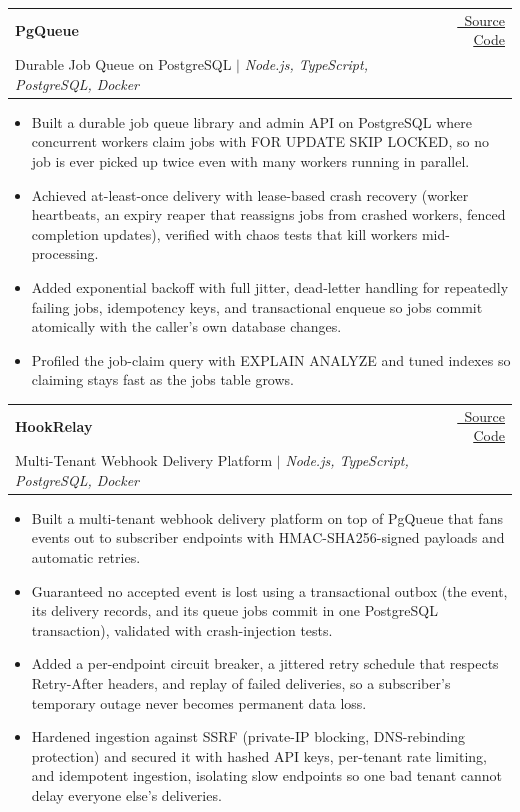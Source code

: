 \documentclass[a4paper,10pt]{article}
\makeatletter
\newcommand{\link}[2]{\href{#1}{\textcolor{NavyBlue}{\underline{#2}}}}
\newcommand{\resumeItem}[1]{
  \item\small{
    {#1 \vspace{-2pt}}
  }
}
\newcommand{\resumeProjectHeading}[3]{
    \item
    \begin{tabular*}{0.97\textwidth}{l@{\extracolsep{\fill}}r}
      \small\textbf{#1} & \small#3 \\[2pt]
      \small#2 & \\
    \end{tabular*}\vspace{-7pt}
}
\newcommand{\resumeItemListStart}{\begin{itemize}[leftmargin=0.2in]}
\newcommand{\resumeItemListEnd}{\end{itemize}\vspace{-5pt}}
\makeatother
\begin{document}
    \resumeProjectHeading
      {PgQueue}
      {Durable Job Queue on PostgreSQL \hspace{0.5em}$|$\hspace{0.5em} \emph{Node.js, TypeScript, PostgreSQL, Docker}}
      {\link{https://github.com/nitish9302/pgqueue}{\faCode\ Source Code}}
      \resumeItemListStart
        \resumeItem{Built a durable job queue library and admin API on PostgreSQL where concurrent workers claim jobs with FOR UPDATE SKIP LOCKED, so no job is ever picked up twice even with many workers running in parallel.}
        \resumeItem{Achieved at-least-once delivery with lease-based crash recovery (worker heartbeats, an expiry reaper that reassigns jobs from crashed workers, fenced completion updates), verified with chaos tests that kill workers mid-processing.}
        \resumeItem{Added exponential backoff with full jitter, dead-letter handling for repeatedly failing jobs, idempotency keys, and transactional enqueue so jobs commit atomically with the caller's own database changes.}
        \resumeItem{Profiled the job-claim query with EXPLAIN ANALYZE and tuned indexes so claiming stays fast as the jobs table grows.}
      \resumeItemListEnd

    \resumeProjectHeading
      {HookRelay}
      {Multi-Tenant Webhook Delivery Platform \hspace{0.5em}$|$\hspace{0.5em} \emph{Node.js, TypeScript, PostgreSQL, Docker}}
      {\link{https://github.com/nitish9302/hookrelay}{\faCode\ Source Code}}
      \resumeItemListStart
        \resumeItem{Built a multi-tenant webhook delivery platform on top of PgQueue that fans events out to subscriber endpoints with HMAC-SHA256-signed payloads and automatic retries.}
        \resumeItem{Guaranteed no accepted event is lost using a transactional outbox (the event, its delivery records, and its queue jobs commit in one PostgreSQL transaction), validated with crash-injection tests.}
        \resumeItem{Added a per-endpoint circuit breaker, a jittered retry schedule that respects Retry-After headers, and replay of failed deliveries, so a subscriber's temporary outage never becomes permanent data loss.}
        \resumeItem{Hardened ingestion against SSRF (private-IP blocking, DNS-rebinding protection) and secured it with hashed API keys, per-tenant rate limiting, and idempotent ingestion, isolating slow endpoints so one bad tenant cannot delay everyone else's deliveries.}
      \resumeItemListEnd
\end{document}
